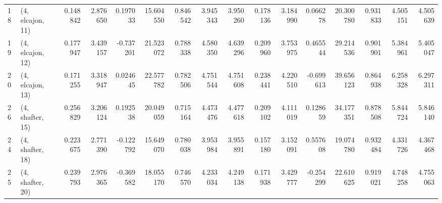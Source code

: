 \begin{tabular}{llrrrrrrrrrrrrrr}
18 &  (4, elcajon, 11) &   0.148842 &  2.876650 &  0.197033 &  15.604550 &  0.846542 &   3.945343 &  3.950260 &  0.178136 &  3.184990 &  0.066278 &   20.300780 &  0.931833 &   4.505151 &   4.505639 \\
19 &  (4, elcajon, 12) &   0.177947 &  3.439157 & -0.737201 &  21.523072 &  0.788338 &   4.580350 &  4.639296 &  0.209960 &  3.753975 &  0.465544 &   29.214536 &  0.901901 &   5.384961 &   5.405047 \\
20 &  (4, elcajon, 13) &   0.171255 &  3.318947 &  0.024645 &  22.577782 &  0.782506 &   4.751544 &  4.751608 &  0.238441 &  4.220510 & -0.699613 &   39.656123 &  0.864938 &   6.258328 &   6.297311 \\
26 &  (4, shafter, 15) &   0.256829 &  3.206124 &  0.192538 &  20.049059 &  0.715164 &   4.473476 &  4.477618 &  0.209102 &  4.111019 &  0.128659 &   34.177351 &  0.878508 &   5.844724 &   5.846140 \\
24 &  (4, shafter, 18) &   0.223675 &  2.771390 & -0.122792 &  15.649070 &  0.780038 &   3.953984 &  3.955891 &  0.157180 &  3.152091 &  0.557608 &   19.074780 &  0.932484 &   4.331726 &   4.367468 \\
25 &  (4, shafter, 20) &   0.239793 &  2.976365 & -0.369582 &  18.055170 &  0.746570 &   4.233034 &  4.249138 &  0.171938 &  3.429777 & -0.254299 &   22.610625 &  0.919021 &   4.748258 &   4.755063 \\
\bottomrule
\end{tabular}
